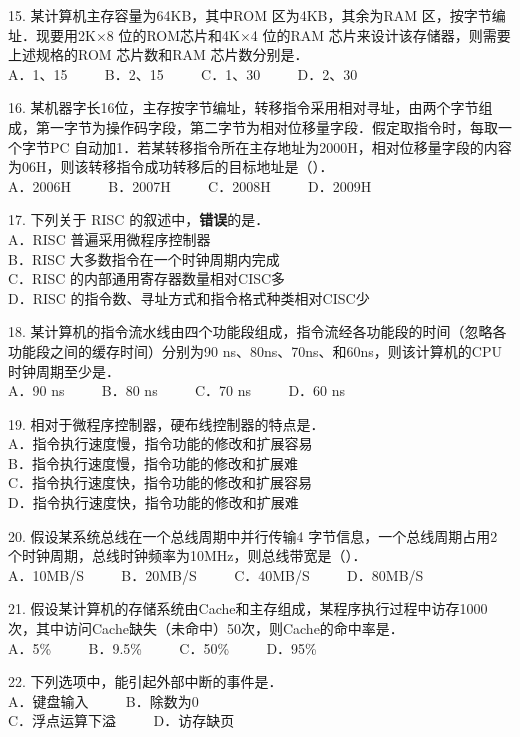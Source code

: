 15. 某计算机主存容量为64KB，其中ROM 区为4KB，其余为RAM 区，按字节编址．现要用2K×8 位的ROM芯片和4K×4 位的RAM 芯片来设计该存储器，则需要上述规格的ROM 芯片数和RAM 芯片数分别是． \\
A．1、15 $\qquad$ B．2、15 $\qquad$ C．1、30 $\qquad$ D．2、30

16. 某机器字长16位，主存按字节编址，转移指令采用相对寻址，由两个字节组成，第一字节为操作码字段，第二字节为相对位移量字段．假定取指令时，每取一个字节PC 自动加1．若某转移指令所在主存地址为2000H，相对位移量字段的内容为06H，则该转移指令成功转移后的目标地址是（）． \\
A．2006H $\qquad$ B．2007H $\qquad$ C．2008H $\qquad$ D．2009H

17. 下列关于 RISC 的叙述中，\textbf{错误}的是． \\
A．RISC 普遍采用微程序控制器 \\
B．RISC 大多数指令在一个时钟周期内完成 \\
C．RISC 的内部通用寄存器数量相对CISC多 \\
D．RISC 的指令数、寻址方式和指令格式种类相对CISC少

18. 某计算机的指令流水线由四个功能段组成，指令流经各功能段的时间（忽略各功能段之间的缓存时间）分别为90 ns、80ns、70ns、和60ns，则该计算机的CPU时钟周期至少是． \\
A．90 ns $\qquad$ B．80 ns $\qquad$ C．70 ns $\qquad$ D．60 ns

19. 相对于微程序控制器，硬布线控制器的特点是． \\
A．指令执行速度慢，指令功能的修改和扩展容易 \\
B．指令执行速度慢，指令功能的修改和扩展难 \\
C．指令执行速度快，指令功能的修改和扩展容易 \\
D．指令执行速度快，指令功能的修改和扩展难

20. 假设某系统总线在一个总线周期中并行传输4 字节信息，一个总线周期占用2 个时钟周期，总线时钟频率为10MHz，则总线带宽是（）． \\
A．10MB/S $\qquad$ B．20MB/S $\qquad$ C．40MB/S $\qquad$ D．80MB/S

21. 假设某计算机的存储系统由Cache和主存组成，某程序执行过程中访存1000次，其中访问Cache缺失（未命中）50次，则Cache的命中率是． \\
A．5\% $\qquad$ B．9.5\% $\qquad$ C．50\% $\qquad$ D．95\%

22. 下列选项中，能引起外部中断的事件是． \\
A．键盘输入 $\qquad$ B．除数为0 \\
C．浮点运算下溢  $\qquad$ D．访存缺页

